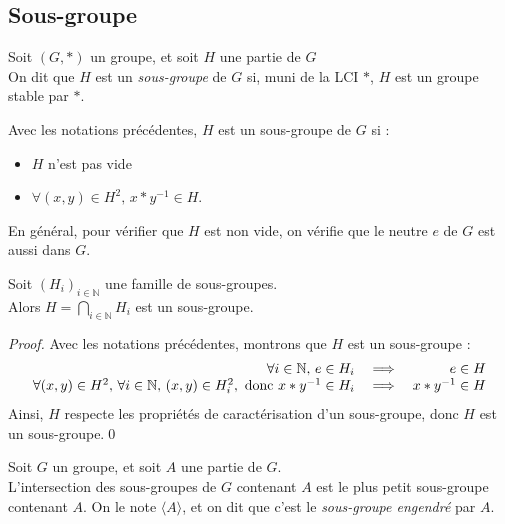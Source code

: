 \documentclass[11pt,a4paper,fleqn,pdftex]{report}
\begin{document}
\subsection{Sous-groupe} %
\label{sec:sous_groupe}
\begin{dfn}
     Soit $(G,*)$ un groupe, et soit $H$ une partie de $G$\\
     On dit que $H$ est un \emph{sous-groupe} de $G$ si, muni de la \gls{LCI} $*$, $H$ est un groupe stable par $*$.
\end{dfn}
\needspace{5cm}
\begin{itheorem}
     Avec les notations précédentes, $H$ est un sous-groupe de $G$ si : 
     \begin{itemize}
         \item $H$ n'est pas vide
         \item $\forall (x,y) \in H^2,\, x*y^{-1} \in H$.
     \end{itemize}
     En général, pour vérifier que $H$ est non vide, on vérifie que le neutre $e$ de $G$ est aussi dans $G$.
\end{itheorem}
\begin{theorem}
     Soit $\left( H_i \right)_{i\in \mathbb{N}}$ une famille de sous-groupes.\\
     Alors $H=\bigcap_{i\in \mathbb{N}} H_i$ est un sous-groupe.
\end{theorem}
\begin{proof}
     Avec les notations précédentes, montrons que $H$ est un sous-groupe : 
     \[
     \begin{array}{r c r}
         \forall i\in \mathbb{N},\, e\in H_i &\implies & e\in H \\
         \forall (x,y)\in H^2,\, \forall i\in \mathbb{N},\, (x,y)\in H_i^2,\text{ donc }x*y^{-1}\in H_i & \implies & x*y^{-1}\in H
     \end{array}
     \]
     Ainsi, $H$ respecte les propriétés de caractérisation d'un sous-groupe, donc $H$ est un sous-groupe.\qed
\end{proof}
\begin{dfn}
     Soit $G$ un groupe, et soit $A$ une partie de $G$. \\
     L'intersection des sous-groupes de $G$ contenant $A$ est le plus petit sous-groupe contenant $A$. On le note $\langle A \rangle$, et on dit que c'est le \emph{sous-groupe engendré} par $A$.
\end{dfn}
\end{document}

